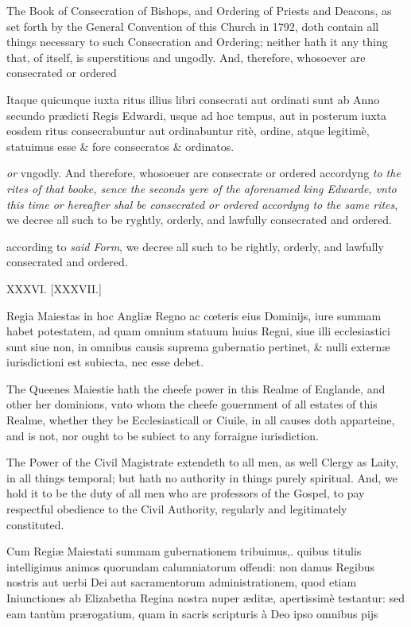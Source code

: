 The Book of Consecration of Bishops, and Ordering of Priests and Deacons, as set forth by the General Convention of this Church in 1792, doth contain all things necessary to such Consecration and Ordering; neither hath it any thing that, of itself, is superstitious and ungodly. And, therefore, whosoever are consecrated or ordered

Itaque quicunque iuxta ritus illius libri consecrati aut ordinati sunt ab Anno secundo prædicti Regis Edwardi, usque ad hoc tempus, aut in posterum iuxta eosdem ritus consecrabuntur aut ordinabuntur ritè, ordine, atque legitimè, statuimus esse \& fore consecratos \& ordinatos.

\emph{or} vngodly. And therefore, whosoeuer are consecrate or ordered accordyng \emph{to the rites of that booke, sence the seconds yere of the aforenamed king Edwarde, vnto this time or hereafter shal be consecrated or ordered accordyng to the same rites}, we decree all such to be ryghtly, orderly, and lawfully consecrated and ordered.

according to \emph{said Form}, we decree all such to be rightly, orderly, and lawfully consecrated and ordered.

XXXVI. [XXXVII.]


Regia Maiestas in hoc Angliæ Regno ac cœteris eius Dominijs, iure summam habet potestatem, ad quam omnium statuum huius Regni, siue illi ecclesiastici sunt siue non, in omnibus causis suprema gubernatio pertinet, \& nulli externæ iurisdictioni est subiecta, nec esse debet.

The Queenes Maiestie hath the cheefe power in this Realme of Englande, and other her dominions, vnto whom the cheefe gouernment of all estates of this Realme, whether they be Ecclesiasticall or Ciuile, in all causes doth apparteine, and is not, nor ought to be subiect to any forraigne iurisdiction.

The Power of the Civil Magistrate extendeth to all men, as well Clergy as Laity, in all things temporal; but hath no authority in things purely spiritual. And, we hold it to be the duty of all men who are professors of the Gospel, to pay respectful obedience to the Civil Authority, regularly and legitimately constituted.

Cum Regiæ Maiestati summam gubernationem tribuimus,. quibus titulis intelligimus animos quorundam calumniatorum offendi: non damus Regibus nostris aut uerbi Dei aut sacramentorum administrationem, quod etiam Iniunctiones ab Elizabetha Regina nostra nuper æditæ, apertissimè testantur: sed eam tantùm prærogatium, quam in sacris scripturis à Deo ipso omnibus pijs

